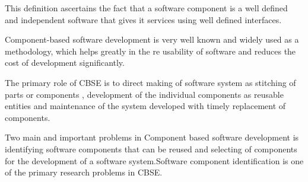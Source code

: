 \documentclass[12pt]{article}
\begin{document}
This definition ascertains the fact that a software component is a well defined and independent software that gives it services using well defined interfaces.

Component-based software development is very well known and widely used as a methodology, which helps greatly in the re usability of software and reduces the cost of development significantly.

The primary role of CBSE is to direct making of software system as stitching of parts or components , development of the individual components as reusable entities and maintenance of the system developed with timely replacement of components.

Two main and important problems in Component based software development is identifying software components that can be reused and selecting of components for the development of a software system.Software component identification is one of the primary research problems in CBSE. 
\end{document}

